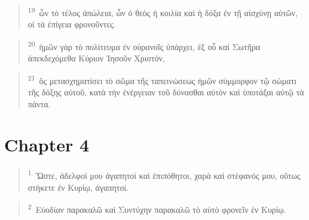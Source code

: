 \documentclass{article}
\newcommand{\currentverse}{1} %
\newcommand{\setcurrentverse}[1]{\renewcommand{\currentverse}{#1}}
\begin{document}
\begin{verse}

\setcurrentverse{19}

\setcounter{footnote}{0}

\textsuperscript{19}~ὧν τὸ τέλος ἀπώλεια, ὧν ὁ θεὸς ἡ κοιλία καὶ ἡ δόξα ἐν τῇ αἰσχύνῃ αὐτῶν, οἱ τὰ ἐπίγεια φρονοῦντες.

\end{verse}

\begin{verse}

\setcurrentverse{20}

\setcounter{footnote}{0}

\textsuperscript{20}~ἡμῶν γὰρ τὸ πολίτευμα ἐν οὐρανοῖς ὑπάρχει, ἐξ οὗ καὶ Σωτῆρα ἀπεκδεχόμεθα Κύριον Ἰησοῦν Χριστόν,

\end{verse}

\begin{verse}

\setcurrentverse{21}

\setcounter{footnote}{0}

\textsuperscript{21}~ὃς μετασχηματίσει τὸ σῶμα τῆς ταπεινώσεως ἡμῶν σύμμορφον τῷ σώματι τῆς δόξης αὐτοῦ, κατὰ τὴν ἐνέργειαν τοῦ δύνασθαι αὐτὸν καὶ ὑποτάξαι αὐτῷ τὰ πάντα.

\end{verse}

\section*{Chapter 4}

\begin{verse}

\setcurrentverse{1}

\setcounter{footnote}{0}

\textsuperscript{1}~Ὥστε, ἀδελφοί μου ἀγαπητοὶ καὶ ἐπιπόθητοι, χαρὰ καὶ στέφανός μου, οὕτως στήκετε ἐν Κυρίῳ, ἀγαπητοί.

\end{verse}

\begin{verse}

\setcurrentverse{2}

\setcounter{footnote}{0}

\textsuperscript{2}~Εὐοδίαν παρακαλῶ καὶ Συντύχην παρακαλῶ τὸ αὐτὸ φρονεῖν ἐν Κυρίῳ.

\end{verse}
\end{document}
